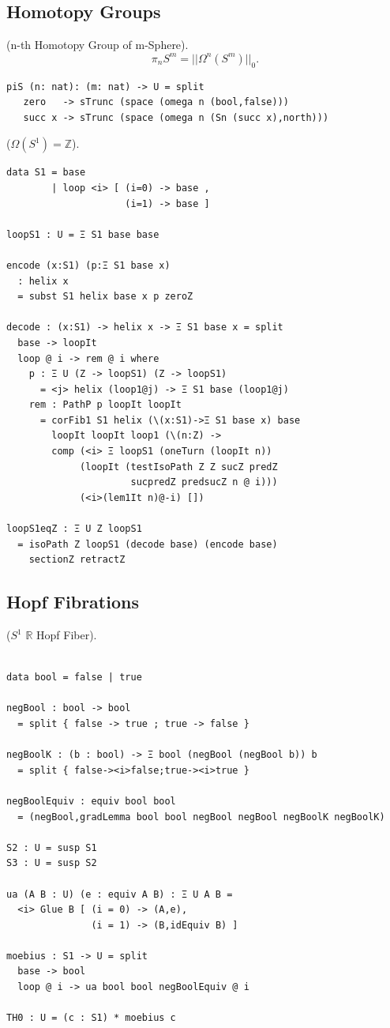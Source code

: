 \documentclass{article}
\begin{document}
\newpage
\subsection{Homotopy Groups}

\begin{definition} (n-th Homotopy Group of m-Sphere).
$$\pi_{n}S^{m} = ||\Omega^{n}(S^{m})||_0.$$
\begin{lstlisting}
piS (n: nat): (m: nat) -> U = split
   zero   -> sTrunc (space (omega n (bool,false)))
   succ x -> sTrunc (space (omega n (Sn (succ x),north)))
\end{lstlisting}
\end{definition}

\begin{theorem} ($\Omega(S^1)=\mathbb{Z}$).
\begin{lstlisting}
data S1 = base
        | loop <i> [ (i=0) -> base ,
                     (i=1) -> base ]

loopS1 : U = Ξ S1 base base

encode (x:S1) (p:Ξ S1 base x)
  : helix x
  = subst S1 helix base x p zeroZ

decode : (x:S1) -> helix x -> Ξ S1 base x = split
  base -> loopIt
  loop @ i -> rem @ i where
    p : Ξ U (Z -> loopS1) (Z -> loopS1)
      = <j> helix (loop1@j) -> Ξ S1 base (loop1@j)
    rem : PathP p loopIt loopIt
      = corFib1 S1 helix (\(x:S1)->Ξ S1 base x) base
        loopIt loopIt loop1 (\(n:Z) ->
        comp (<i> Ξ loopS1 (oneTurn (loopIt n))
             (loopIt (testIsoPath Z Z sucZ predZ
                      sucpredZ predsucZ n @ i)))
             (<i>(lem1It n)@-i) [])

loopS1eqZ : Ξ U Z loopS1
  = isoPath Z loopS1 (decode base) (encode base)
    sectionZ retractZ
\end{lstlisting}
\end{theorem}

\newpage
\subsection{Hopf Fibrations}

\begin{example} ($S^1$ $\mathbb{R}$ Hopf Fiber).
\begin{lstlisting}

data bool = false | true

negBool : bool -> bool
  = split { false -> true ; true -> false }

negBoolK : (b : bool) -> Ξ bool (negBool (negBool b)) b
  = split { false-><i>false;true-><i>true }

negBoolEquiv : equiv bool bool
  = (negBool,gradLemma bool bool negBool negBool negBoolK negBoolK)

S2 : U = susp S1
S3 : U = susp S2

ua (A B : U) (e : equiv A B) : Ξ U A B =
  <i> Glue B [ (i = 0) -> (A,e),
               (i = 1) -> (B,idEquiv B) ]

moebius : S1 -> U = split
  base -> bool
  loop @ i -> ua bool bool negBoolEquiv @ i

TH0 : U = (c : S1) * moebius c
\end{lstlisting}
\end{example}
\end{document}
